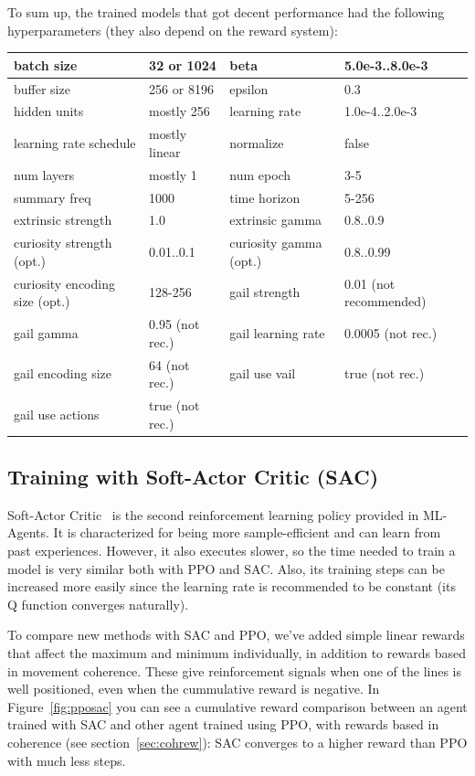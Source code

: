 To sum up, the trained models that got decent performance had the following hyperparameters (they also depend on the reward system):

\begin{center}
	\begin{tabular}{ | m{4cm} | m{2.5cm}||m{4cm} | m{2.5cm} | } 
		\hline
			batch size & 32 or 1024 & beta & 5.0e-3..8.0e-3\\ 
		\hline
			buffer size & 256 or 8196 & epsilon & 0.3\\
		\hline
			hidden units & mostly 256 & learning rate & 1.0e-4..2.0e-3\\
		\hline
			learning rate schedule & mostly linear & normalize & false\\
		\hline
			num layers & mostly 1 & num epoch & 3-5\\
		\hline
			summary freq & 1000 & time horizon & 5-256\\
		\hline
			extrinsic strength & 1.0 & extrinsic gamma & 0.8..0.9\\
		\hline
			curiosity strength (opt.) & 0.01..0.1 & curiosity gamma (opt.) & 0.8..0.99\\
		\hline
			curiosity encoding size (opt.) & 128-256 & gail strength & 0.01 (not recommended)\\
		\hline
			gail gamma & 0.95 (not rec.) & gail learning rate & 0.0005 (not rec.)\\
		\hline
			gail encoding size & 64 (not rec.) & gail use vail & true (not rec.)\\
		\hline
			gail use actions & true (not rec.) & & \\
		\hline
	\end{tabular}
\end{center}

\subsection{Training with Soft-Actor Critic (SAC)}
\label{sec:trainingSAC}

Soft-Actor Critic~\cite{sacpolicy} is the second reinforcement learning policy provided in ML-Agents. It is characterized for being more sample-efficient and can learn from past experiences. However, it also executes slower, so the time needed to train a model is very similar both with PPO and SAC. Also, its training steps can be increased more easily since the learning rate is recommended to be constant (its Q function converges naturally).

To compare new methods with SAC and PPO, we've added simple linear rewards that affect the maximum and minimum individually, in addition to rewards based in movement coherence. These give reinforcement signals when one of the lines is well positioned, even when the cummulative reward is negative. In Figure~\ref{fig:pposac} you can see a cumulative reward comparison between an agent trained with SAC and other agent trained using PPO, with rewards based in coherence (see section~\ref{sec:cohrew}): SAC converges to a higher reward than PPO with much less steps.

